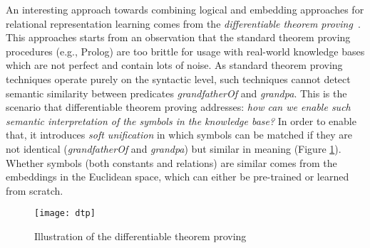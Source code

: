 An interesting approach towards combining logical and embedding approaches for relational representation learning comes from the \textit{differentiable theorem proving}~\cite{DTP2017}.
This approaches starts from an observation that the standard theorem proving procedures (e.g., Prolog) are too brittle for usage with real-world knowledge bases which are not perfect and contain lots of noise.
As standard theorem proving techniques operate purely on the syntactic level, such techniques cannot detect semantic similarity between predicates \textit{grandfatherOf} and \textit{grandpa}.
This is the scenario that differentiable theorem proving addresses: \textit{how can we enable such semantic interpretation of the symbols in the knowledge base?}
In order to enable that, it introduces \textit{soft unification} in which symbols can be matched if they are not identical (\textit{grandfatherOf} and \textit{grandpa}) but similar in meaning (Figure \ref{fig:dtp}).
Whether symbols (both constants and relations) are similar comes from the embeddings in the Euclidean space, which can either be pre-trained or learned from scratch.


\begin{figure}
	\centering
	\texttt{[image: dtp]}
	\caption{Illustration of the differentiable theorem proving\label{fig:dtp}}
\end{figure}









\cleardoublepage

